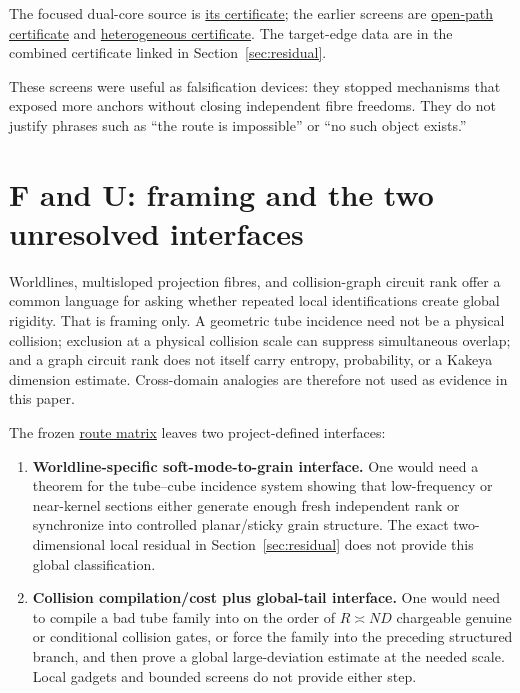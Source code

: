 \documentclass[11pt]{article}
\newcommand{\assetpath}{../assets/yuanjiang_kakeya_recollision_assets_2026-08-11/unpacked/}
\begin{document}
The focused dual-core source is
\href{\assetpath dual_core_tertiary_certificate_2026-08-12.json}{its certificate};
the earlier screens are
\href{\assetpath protein_tertiary_fold_certificate_2026-08-12.json}{open-path certificate} and
\href{\assetpath heterogeneous_tertiary_fold_certificate_2026-08-12.json}{heterogeneous certificate}.
The target-edge data are in the combined certificate linked in Section~\ref{sec:residual}.

These screens were useful as falsification devices: they stopped mechanisms that exposed more anchors without closing independent fibre freedoms. They do not justify phrases such as ``the route is impossible'' or ``no such object exists.''

\section{F and U: framing and the two unresolved interfaces}
\label{sec:interfaces}

Worldlines, multisloped projection fibres, and collision-graph circuit rank offer a common language for asking whether repeated local identifications create global rigidity. That is framing only. A geometric tube incidence need not be a physical collision; exclusion at a physical collision scale can suppress simultaneous overlap; and a graph circuit rank does not itself carry entropy, probability, or a Kakeya dimension estimate. Cross-domain analogies are therefore not used as evidence in this paper.

The frozen
\href{\assetpath proof_route_matrix_2026-08-13.md}{route matrix}
leaves two project-defined interfaces:
\begin{enumerate}
  \item \textbf{Worldline-specific soft-mode-to-grain interface.} One would need a theorem for the tube--cube incidence system showing that low-frequency or near-kernel sections either generate enough fresh independent rank or synchronize into controlled planar/sticky grain structure. The exact two-dimensional local residual in Section~\ref{sec:residual} does not provide this global classification.
  \item \textbf{Collision compilation/cost plus global-tail interface.} One would need to compile a bad tube family into on the order of $R\asymp ND$ chargeable genuine or conditional collision gates, or force the family into the preceding structured branch, and then prove a global large-deviation estimate at the needed scale. Local gadgets and bounded screens do not provide either step.
\end{enumerate}
\end{document}
